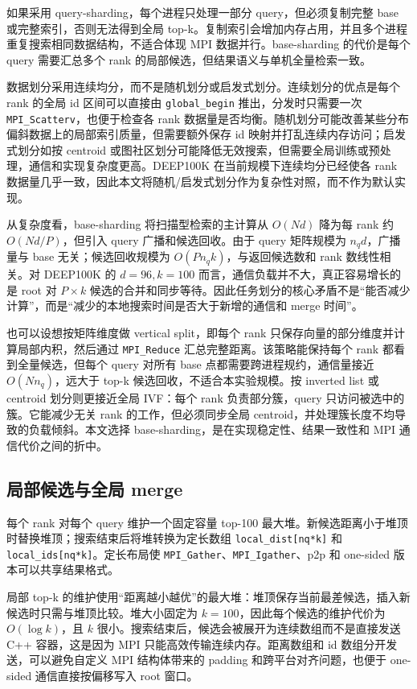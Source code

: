 \documentclass[11pt,a4paper]{article}
\begin{document}
如果采用 query-sharding，每个进程只处理一部分 query，但必须复制完整 base 或完整索引，否则无法得到全局 top-k。复制索引会增加内存占用，并且多个进程重复搜索相同数据结构，不适合体现 MPI 数据并行。base-sharding 的代价是每个 query 需要汇总多个 rank 的局部候选，但结果语义与单机全量检索一致。

数据划分采用连续均分，而不是随机划分或启发式划分。连续划分的优点是每个 rank 的全局 id 区间可以直接由 \texttt{global\_begin} 推出，分发时只需要一次 \texttt{MPI\_Scatterv}，也便于检查各 rank 数据量是否均衡。随机划分可能改善某些分布偏斜数据上的局部索引质量，但需要额外保存 id 映射并打乱连续内存访问；启发式划分如按 centroid 或图社区划分可能降低无效搜索，但需要全局训练或预处理，通信和实现复杂度更高。DEEP100K 在当前规模下连续均分已经使各 rank 数据量几乎一致，因此本文将随机/启发式划分作为复杂性对照，而不作为默认实现。

从复杂度看，base-sharding 将扫描型检索的主计算从 $O(Nd)$ 降为每 rank 约 $O(Nd/P)$，但引入 query 广播和候选回收。由于 query 矩阵规模为 $n_qd$，广播量与 base 无关；候选回收规模为 $O(Pn_qk)$，与返回候选数和 rank 数线性相关。对 DEEP100K 的 $d=96,k=100$ 而言，通信负载并不大，真正容易增长的是 root 对 $P\times k$ 候选的合并和同步等待。因此任务划分的核心矛盾不是“能否减少计算”，而是“减少的本地搜索时间是否大于新增的通信和 merge 时间”。

也可以设想按矩阵维度做 vertical split，即每个 rank 只保存向量的部分维度并计算局部内积，然后通过 \texttt{MPI\_Reduce} 汇总完整距离。该策略能保持每个 rank 都看到全量候选，但每个 query 对所有 base 点都需要跨进程规约，通信量接近 $O(Nn_q)$，远大于 top-k 候选回收，不适合本实验规模。按 inverted list 或 centroid 划分则更接近全局 IVF：每个 rank 负责部分簇，query 只访问被选中的簇。它能减少无关 rank 的工作，但必须同步全局 centroid，并处理簇长度不均导致的负载倾斜。本文选择 base-sharding，是在实现稳定性、结果一致性和 MPI 通信代价之间的折中。

\subsection{局部候选与全局 merge}

每个 rank 对每个 query 维护一个固定容量 top-100 最大堆。新候选距离小于堆顶时替换堆顶；搜索结束后将堆转换为定长数组 \texttt{local\_dist[nq*k]} 和 \texttt{local\_ids[nq*k]}。定长布局使 \texttt{MPI\_Gather}、\texttt{MPI\_Igather}、p2p 和 one-sided 版本可以共享结果格式。

局部 top-k 的维护使用“距离越小越优”的最大堆：堆顶保存当前最差候选，插入新候选时只需与堆顶比较。堆大小固定为 $k=100$，因此每个候选的维护代价为 $O(\log k)$，且 $k$ 很小。搜索结束后，候选会被展开为连续数组而不是直接发送 C++ 容器，这是因为 MPI 只能高效传输连续内存。距离数组和 id 数组分开发送，可以避免自定义 MPI 结构体带来的 padding 和跨平台对齐问题，也便于 one-sided 通信直接按偏移写入 root 窗口。
\end{document}
